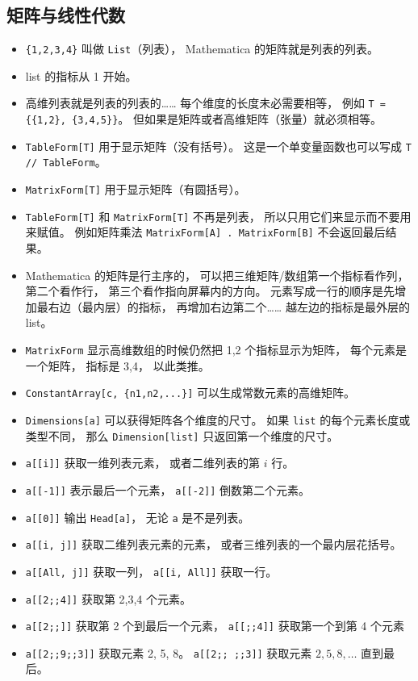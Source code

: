 \subsection{矩阵与线性代数}
\begin{itemize}
\item \verb|{1,2,3,4}| 叫做 \verb|List|（列表）， Mathematica 的矩阵就是列表的列表。
\item list 的指标从 1 开始。
\item 高维列表就是列表的列表的…… 每个维度的长度未必需要相等， 例如 \verb|T = {{1,2}, {3,4,5}}|。 但如果是矩阵或者高维矩阵（张量）就必须相等。
\item \verb|TableForm[T]| 用于显示矩阵（没有括号）。 这是一个单变量函数也可以写成 \verb|T // TableForm|。
\item \verb|MatrixForm[T]| 用于显示矩阵（有圆括号）。
\item \verb|TableForm[T]| 和 \verb|MatrixForm[T]| 不再是列表， 所以只用它们来显示而不要用来赋值。 例如矩阵乘法 \verb|MatrixForm[A] . MatrixForm[B]| 不会返回最后结果。
\item Mathematica 的矩阵是行主序的， 可以把三维矩阵/数组第一个指标看作列， 第二个看作行， 第三个看作指向屏幕内的方向。 元素写成一行的顺序是先增加最右边（最内层）的指标， 再增加右边第二个…… 越左边的指标是最外层的 list。
\item \verb|MatrixForm| 显示高维数组的时候仍然把 1,2 个指标显示为矩阵， 每个元素是一个矩阵， 指标是 3,4， 以此类推。
\item \verb|ConstantArray[c, {n1,n2,...}]| 可以生成常数元素的高维矩阵。
\item \verb|Dimensions[a]| 可以获得矩阵各个维度的尺寸。 如果 \verb|list| 的每个元素长度或类型不同， 那么 \verb|Dimension[list]| 只返回第一个维度的尺寸。
\item \verb|a[[i]]| 获取一维列表元素， 或者二维列表的第 $i$ 行。
\item \verb|a[[-1]]| 表示最后一个元素， \verb|a[[-2]]| 倒数第二个元素。
\item \verb|a[[0]]| 输出 \verb|Head[a]|， 无论 \verb|a| 是不是列表。
\item \verb|a[[i, j]]| 获取二维列表元素的元素， 或者三维列表的一个最内层花括号。
\item \verb|a[[All, j]]| 获取一列， \verb|a[[i, All]]| 获取一行。
\item \verb|a[[2;;4]]| 获取第 2,3,4 个元素。
\item \verb|a[[2;;]]| 获取第 2 个到最后一个元素， \verb|a[[;;4]]| 获取第一个到第 4 个元素
\item \verb|a[[2;;9;;3]]| 获取元素 2, 5, 8。 \verb|a[[2;; ;;3]]| 获取元素 $2, 5, 8, \dots$ 直到最后。

\end{itemize}
